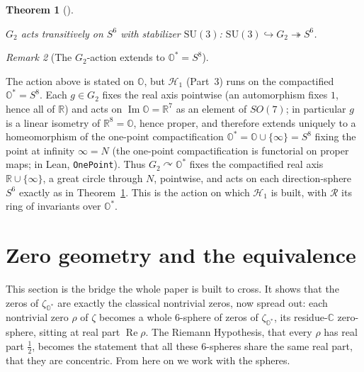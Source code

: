 \documentclass[11pt]{article}
\newcommand{\OO}{\mathbb{O}}
\newcommand{\CC}{\mathbb{C}}
\newcommand{\RR}{\mathbb{R}}
\newcommand{\Ostar}{\OO^{*}}
\newcommand{\zetaO}{\zeta_{\Ostar}}
\DeclareMathOperator{\re}{Re}
\DeclareMathOperator{\im}{Im}
\providecommand{\Gtwo}{G_2}
\providecommand{\lean}[1]{}
\providecommand{\uses}[1]{}
\theoremstyle{plain}
\newtheorem{theorem}{Theorem}[section]
\theoremstyle{definition}
\theoremstyle{remark}
\newtheorem{remark}[theorem]{Remark}
\begin{document}
\begin{theorem}[]\label{thm:G2-S6}
\lean{G2.exists_smul_eq_of_mem_unitImaginarySphere}
$\Gtwo$ acts transitively on $S^6$ with stabilizer $\mathrm{SU}(3)$:
$\mathrm{SU}(3)\hookrightarrow\Gtwo\twoheadrightarrow S^6$.
\end{theorem}

\begin{remark}[The $\Gtwo$-action extends to $\Ostar=S^8$]\label{rmk:G2-compact}
\uses{def:G2, def:carrier}
The action above is stated on $\OO$, but $\mathcal H_1$ (Part~3) runs on the compactified
$\Ostar=S^8$. Each $g\in\Gtwo$ fixes the real axis pointwise (an automorphism fixes $1$, hence all
of $\RR$) and acts on $\im\OO=\RR^7$ as an element of $SO(7)$; in particular $g$ is a linear
isometry of $\RR^8=\OO$, hence proper, and therefore extends uniquely to a homeomorphism of the
one-point compactification $\Ostar=\OO\cup\{\infty\}=S^8$ fixing the point at infinity $\infty=N$ (the one-point
compactification is functorial on proper maps; in Lean, \texttt{OnePoint}). Thus
$\Gtwo\curvearrowright\Ostar$ fixes the compactified real axis $\RR\cup\{\infty\}$, a great circle
through $N$, pointwise, and acts on each direction-sphere $S^6$ exactly as in
Theorem~\ref{thm:G2-S6}. This is the action on which $\mathcal H_1$ is built, with $\mathcal R$ its
ring of invariants over $\Ostar$.
\end{remark}

\section{Zero geometry and the equivalence}

This section is the bridge the whole paper is built to cross. It shows that the zeros of $\zetaO$ are
exactly the classical nontrivial zeros, now spread out: each nontrivial zero $\rho$ of $\zeta$
becomes a whole $6$-sphere of zeros of $\zetaO$, its residue-$\CC$ zero-sphere, sitting at real part
$\re\rho$. The Riemann Hypothesis, that every $\rho$ has real part $\tfrac12$, becomes the statement
that all these $6$-spheres share the same real part, that they are concentric. From here on we work
with the spheres.
\end{document}
